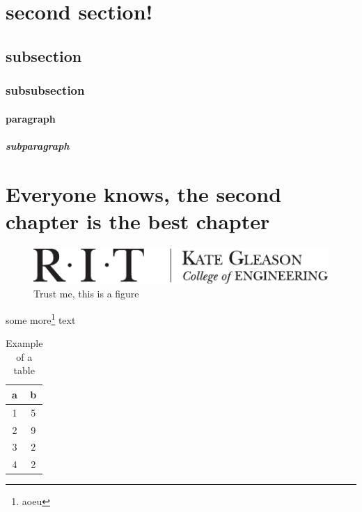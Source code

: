 \documentclass[microsys]{ritthesis}
\providecommand{\chapter}[1]{\section{#1}}
\begin{document}
\section{second section!}

\subsection{subsection}

\subsubsection{subsubsection}

\paragraph{paragraph}

\subparagraph{subparagraph}

\lipsum{}
\chapter{Everyone knows, the second chapter is the best chapter}
\lipsum{}

\begin{figure}
\centering
\includegraphics{kgcoelogohoriz}
\caption{Trust me, this is a figure}
\label{fig:samp}
\end{figure}

some more\footnote{aoeu} text

\begin{table}
\centering
\caption{Example of a table}
\label{tab:samp}
\begin{tabular}{cc}
\toprule
a		& b\\
\midrule
1		& 5\\
2		& 9\\
3		& 2\\
4		& 2\\
\bottomrule
\end{tabular}
\end{table}
\end{document}
